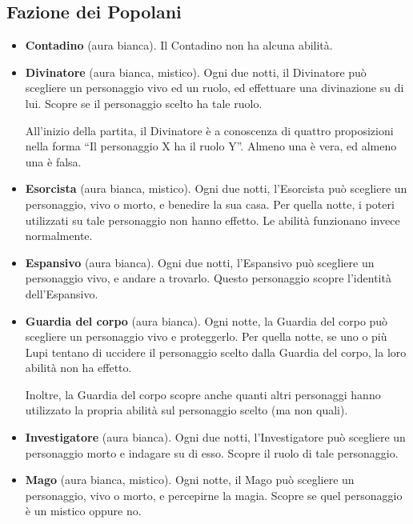 \documentclass[a4paper,10pt]{article}
\begin{document}
\subsection*{Fazione dei Popolani}

\begin{itemize}
	
	\item {\bf Contadino} (aura bianca). Il Contadino non ha alcuna abilità.

	\item {\bf Divinatore} (aura bianca, mistico). Ogni due notti, il Divinatore può scegliere un personaggio vivo ed un ruolo, ed effettuare una divinazione su di lui. Scopre se il personaggio scelto ha tale ruolo.
	
	All'inizio della partita, il Divinatore è a conoscenza di quattro proposizioni nella forma ``Il personaggio X ha il ruolo Y''. Almeno una è vera, ed almeno una è falsa.

	\item {\bf Esorcista} (aura bianca, mistico). Ogni due notti, l'Esorcista può scegliere un personaggio, vivo o morto, e benedire la sua casa. Per quella notte, i poteri utilizzati su tale personaggio non hanno effetto. Le abilità funzionano invece normalmente.
 
	\item {\bf Espansivo} (aura bianca). Ogni due notti, l'Espansivo può scegliere un personaggio vivo, e andare a trovarlo. Questo personaggio scopre l'identità dell'Espansivo.

	\item {\bf Guardia del corpo} (aura bianca). Ogni notte, la Guardia del corpo può scegliere un personaggio vivo e proteggerlo. Per quella notte, se uno o più Lupi tentano di uccidere il personaggio scelto dalla Guardia del corpo, la loro abilità non ha effetto.

	Inoltre, la Guardia del corpo scopre anche quanti altri personaggi hanno utilizzato la propria abilità sul personaggio scelto (ma non quali).
 
	\item {\bf Investigatore} (aura bianca). Ogni due notti, l'Investigatore può scegliere un personaggio morto e indagare su di esso. Scopre il ruolo di tale personaggio.

	\item {\bf Mago} (aura bianca, mistico). Ogni notte, il Mago può scegliere un personaggio, vivo o morto, e percepirne la magia. Scopre se quel personaggio è un mistico oppure no.
 

\end{itemize}
\end{document}
